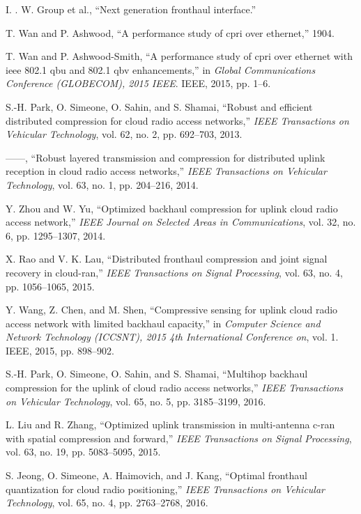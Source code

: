 \begin{multicols}{2}
\begin{thebibliography}{99}
 I. . W. Group et al., “Next generation fronthaul interface.”

 T. Wan and P. Ashwood, “A performance study of cpri over ethernet,” 1904.

 T. Wan and P. Ashwood-Smith, “A performance study of cpri over ethernet with ieee 802.1 qbu and 802.1 qbv enhancements,” in \textit{Global Communications Conference (GLOBECOM), 2015 IEEE}. IEEE, 2015, pp. 1–6.

 S.-H. Park, O. Simeone, O. Sahin, and S. Shamai, “Robust and efficient distributed compression for cloud radio access networks,” \textit{IEEE Transactions on Vehicular Technology}, vol. 62, no. 2, pp. 692–703, 2013.

 ——, “Robust layered transmission and compression for distributed uplink reception in cloud radio access networks,” \textit{IEEE Transactions on Vehicular Technology}, vol. 63, no. 1, pp. 204–216, 2014.

 Y. Zhou and W. Yu, “Optimized backhaul compression for uplink cloud radio access network,” \textit{IEEE Journal on Selected Areas in Communications}, vol. 32, no. 6, pp. 1295–1307, 2014.

 X. Rao and V. K. Lau, “Distributed fronthaul compression and joint signal recovery in cloud-ran,” \textit{IEEE Transactions on Signal Processing}, vol. 63, no. 4, pp. 1056–1065, 2015.

 Y. Wang, Z. Chen, and M. Shen, “Compressive sensing for uplink cloud radio access network with limited backhaul capacity,” in \textit{Computer Science and Network Technology (ICCSNT), 2015 4th International Conference on}, vol. 1. IEEE, 2015, pp. 898–902.

S.-H. Park, O. Simeone, O. Sahin, and S. Shamai, “Multihop backhaul compression for the uplink of cloud radio access networks,” \textit{IEEE Transactions on Vehicular Technology}, vol. 65, no. 5, pp. 3185–3199, 2016.

 L. Liu and R. Zhang, “Optimized uplink transmission in multi-antenna c-ran with spatial compression and forward,” \textit{IEEE Transactions on Signal Processing}, vol. 63, no. 19, pp. 5083–5095, 2015.

 S. Jeong, O. Simeone, A. Haimovich, and J. Kang, “Optimal fronthaul quantization for cloud radio positioning,” \textit{IEEE Transactions on Vehicular Technology}, vol. 65, no. 4, pp. 2763–2768, 2016.


\end{thebibliography}
\end{multicols}
